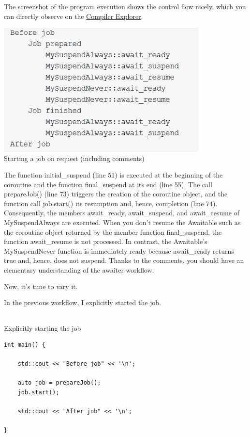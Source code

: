 The screenshot of the program execution shows the control flow nicely, which you can directly observe on the \href{https://godbolt.org/z/T5rcE4}{Compiler Explorer}.

\begin{center}
\includegraphics[width=0.8\textwidth]{content/3/chapter7/images/19.png}\\
Starting a job on request (including comments)
\end{center}

The function initial\_suspend (line 51) is executed at the beginning of the coroutine and the function final\_suspend at its end (line 55). The call prepareJob() (line 73) triggers the creation of the coroutine object, and the function call job.start() its resumption and, hence, completion (line 74). Consequently, the members await\_ready, await\_suspend, and await\_resume of MySuspendAlways are executed. When you don’t resume the Awaitable such as the coroutine object returned by the member function final\_suspend, the function await\_resume is not processed. In contrast, the Awaitable’s MySuspendNever function is immediately ready because await\_ready returns true and, hence, does not suspend. Thanks to the comments, you should have an elementary understanding of the awaiter workflow.

Now, it’s time to vary it.


In the previous workflow, I explicitly started the job.

\hspace*{\fill} \\ %
\noindent
Explicitly starting the job
\begin{lstlisting}[style=styleCXX]
int main() {
	
	std::cout << "Before job" << '\n';
	
	auto job = prepareJob();
	job.start();
	
	std::cout << "After job" << '\n';
	
}
\end{lstlisting}

